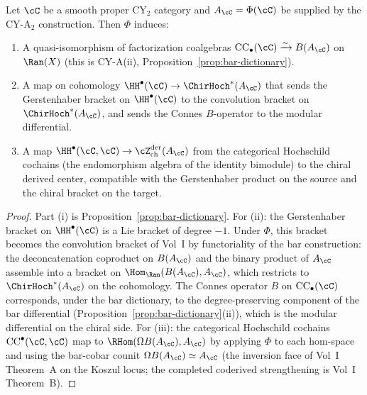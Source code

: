 \begin{theorem}
\label{thm:hochschild-bridge}
Let $\cC$ be a smooth proper CY$_2$ category and $A_\cC = \Phi(\cC)$ be supplied by the CY-A$_2$ construction. Then $\Phi$ induces:
\begin{enumerate}[label=(\roman*)]
 \item A quasi-isomorphism of factorization coalgebras $\mathrm{CC}_\bullet(\cC) \xrightarrow{\sim} B(A_\cC)$ on $\Ran(X)$ (this is CY-A(ii), Proposition~\ref{prop:bar-dictionary}).
 \item A map on cohomology $\HH^\bullet(\cC) \to \ChirHoch^*(A_\cC)$ that sends the Gerstenhaber bracket on $\HH^\bullet(\cC)$ to the convolution bracket on $\ChirHoch^*(A_\cC)$, and sends the Connes $B$-operator to the modular differential.
 \item A map $\HH^\bullet(\cC, \cC) \to \cZ^{\mathrm{der}}_{\mathrm{ch}}(A_\cC)$ from the categorical Hochschild cochains (the endomorphism algebra of the identity bimodule) to the chiral derived center, compatible with the Gerstenhaber product on the source and the chiral bracket on the target.
\end{enumerate}
\end{theorem}

\begin{proof}
Part (i) is Proposition~\ref{prop:bar-dictionary}. For (ii): the Gerstenhaber bracket on $\HH^\bullet(\cC)$ is a Lie bracket of degree $-1$. Under $\Phi$, this bracket becomes the convolution bracket of Vol~I by functoriality of the bar construction: the deconcatenation coproduct on $B(A_\cC)$ and the binary product of $A_\cC$ assemble into a bracket on $\Hom_{\Ran}(B(A_\cC), A_\cC)$, which restricts to $\ChirHoch^*(A_\cC)$ on the cohomology. The Connes operator $B$ on $\mathrm{CC}_\bullet(\cC)$ corresponds, under the bar dictionary, to the degree-preserving component of the bar differential (Proposition~\ref{prop:bar-dictionary}(ii)), which is the modular differential on the chiral side. For (iii): the categorical Hochschild cochains $\mathrm{CC}^\bullet(\cC, \cC)$ map to $\RHom(\Omega B(A_\cC), A_\cC)$ by applying $\Phi$ to each hom-space and using the bar-cobar counit $\Omega B(A_\cC) \simeq A_\cC$ (the inversion face of Vol~I Theorem~A on the Koszul locus; the completed coderived strengthening is Vol~I Theorem~B).
\end{proof}

